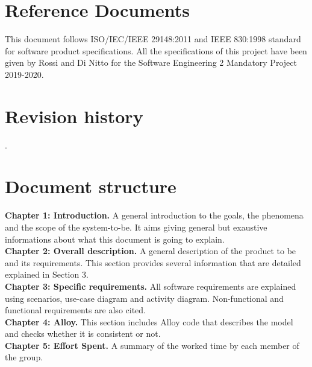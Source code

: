 \documentclass[a4paper, hidelinks, 12pt]{report}
\begin{document}
	\section{Reference Documents}\label{sec:reference-documents}
        This document follows ISO/IEC/IEEE 29148:2011 and IEEE 830:1998  standard for software product specifications.
        All the specifications of this project have been given by Rossi and Di Nitto for the Software Engineering 2 Mandatory Project 2019-2020.

	\section{Revision history}\label{sec:revision-history}
	.

	\section{Document structure}\label{sec:document-structure}
        \textbf{Chapter 1: Introduction.} A general introduction to the goals, the phenomena and the scope of the system-to-be. It aims giving general but exaustive informations about what this document is going to explain.
        \\
        \textbf{Chapter 2: Overall description.} A general description of the product to be and its requirements. This section provides several information that are detailed explained in Section 3.
        \\
        \textbf{Chapter 3: Specific requirements.} All software requirements are explained using scenarios, use-case diagram and activity diagram. Non-functional and functional requirements are also cited.
        \\
        \textbf{Chapter 4: Alloy.} This section includes Alloy code that describes the model and checks whether it is consistent or not.
        \\
        \textbf{Chapter 5: Effort Spent.} A summary of the worked time by each member of the group.
\end{document}
